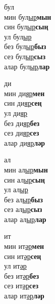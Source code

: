 \begin{multicols}{4}
\begin{enumerate}
\begin{minipage}{\linewidth}
    \item
    бул\\
    мин бул\underline{ыр}\textbf{мын}\\
    син бул\underline{ыр}\textbf{сың}\\
    ул бул\underline{ыр}\\
    без бул\underline{ыр}\textbf{быз}\\
    сез бул\underline{ыр}\textbf{сыз}\\
    алар бул\underline{ыр}\textbf{лар}\\
\end{minipage}

\begin{minipage}{\linewidth}
    \item
    ди\\
    мин ди\underline{яр}\textbf{мен}\\
    син ди\underline{яр}\textbf{сең}\\
    ул ди\underline{яр}\\
    без ди\underline{яр}\textbf{без}\\
    сез ди\underline{яр}\textbf{сез}\\
    алар ди\underline{яр}\textbf{ләр}\\
\end{minipage}

\begin{minipage}{\linewidth}
    \item
    ал\\
    мин ал\underline{ыр}\textbf{мын}\\
    син ал\underline{ыр}\textbf{сың}\\
    ул ал\underline{ыр}\\
    без ал\underline{ыр}\textbf{быз}\\
    сез ал\underline{ыр}\textbf{сыз}\\
    алар ал\underline{ыр}\textbf{лар}\\
\end{minipage}

\begin{minipage}{\linewidth}
    \item
    ит\\
    мин ит\underline{әр}\textbf{мен}\\
    син ит\underline{әр}\textbf{сең}\\
    ул ит\underline{әр}\\
    без ит\underline{әр}\textbf{без}\\
    сез ит\underline{әр}\textbf{сез}\\
    алар ит\underline{әр}\textbf{ләр}\\
\end{minipage}


\end{enumerate}
\end{multicols}
